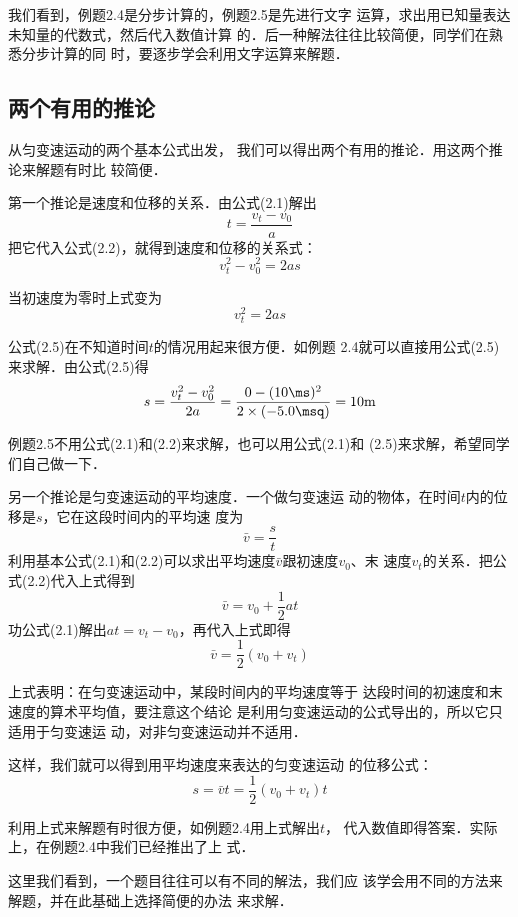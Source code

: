   我们看到，例题2.4是分步计算的，例题2.5是先进行文字
运算，求出用已知量表达未知量的代数式，然后代入数值计算
的．后一种解法往往比较简便，同学们在熟悉分步计算的同
时，要逐步学会利用文字运算来解题．

    \subsection{两个有用的推论}

从匀变速运动的两个基本公式出发，
我们可以得出两个有用的推论．用这两个推论来解题有时比
较简便．

第一个推论是速度和位移的关系．由公式(2.1)解出
\[t=\frac{v_t-v_0}{a} \]
把它代入公式(2.2)，就得到速度和位移的关系式：
\begin{equation}
v^2_t-v^2_0=2as
\end{equation}

当初速度为零时上式变为
\begin{equation}
v^2_t=2as
\end{equation}

    公式(2.5)在不知道时间$t$的情况用起来很方便．如例题
2.4就可以直接用公式(2.5)来求解．由公式(2.5)得
\[s=\frac{v^2_t-v^2_0}{2a}=\frac{0-(10\ms)^2}{2\times (-5.0\msq)}=10{\rm m}\]

    例题2.5不用公式(2.1)和(2.2)来求解，也可以用公式(2.1)和
(2.5)来求解，希望同学们自己做一下．

    另一个推论是匀变速运动的平均速度．一个做匀变速运
动的物体，在时间$t$内的位移是$s$，它在这段时间内的平均速
度为
\[\bar v=\frac{s}{t} \]
利用基本公式(2.1)和(2.2)可以求出平均速度$\bar v$跟初速度$v_0$、末
速度$v_t$的关系．把公式(2.2)代入上式得到
\[\bar v=v_0+\frac{1}{2}at \]
功公式(2.1)解出$at=v_t-v_0$，再代入上式即得
\begin{equation}
\bar v=\frac{1}{2}(v_0+v_t)
\end{equation}

    上式表明：在匀变速运动中，某段时间内的平均速度等于
达段时间的初速度和末速度的算术平均值，要注意这个结论
是利用匀变速运动的公式导出的，所以它只适用于匀变速运
动，对非匀变速运动并不适用．

    这样，我们就可以得到用平均速度来表达的匀变速运动
的位移公式：
\[s=\bar v t=\frac{1}{2} (v_0+v_t)t\]

利用上式来解题有时很方便，如例题2.4用上式解出$t$，
代入数值即得答案．实际上，在例题2.4中我们已经推出了上
式．

    这里我们看到，一个题目往往可以有不同的解法，我们应
该学会用不同的方法来解题，并在此基础上选择简便的办法
来求解．


